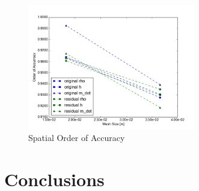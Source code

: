 \documentclass{mc2015}
\begin{document}
\begin{figure}[!h]
	\centering
	\includegraphics[width=0.65\textwidth]{images/Spatial_Study/Order_Of_Accuracy_Summary}
	\caption{Spatial Order of Accuracy}
	\label{fig:Spatial:OOA}
\end{figure}

%
%
%
%
%
%
%
%

\pagebreak

\section{Conclusions}
\end{document}
